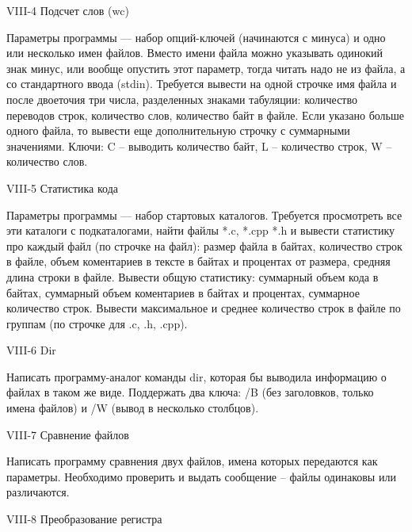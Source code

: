 
VIII-4 Подсчет слов (wc)

Параметры программы — набор опций-ключей (начинаются с минуса) и одно или
несколько имен файлов. Вместо имени файла можно указывать одинокий знак минус,
или вообще опустить этот параметр, тогда читать надо не из файла, а со
стандартного ввода (stdin). Требуется вывести на одной строчке имя файла и
после двоеточия три числа, разделенных знаками табуляции: количество переводов
строк, количество слов, количество байт в файле. Если указано больше одного
файла, то вывести еще дополнительную строчку с суммарными значениями. Ключи: C
– выводить количество байт, L – количество строк, W – количество слов.



VIII-5 Статистика кода

Параметры программы — набор стартовых каталогов. Требуется просмотреть все эти
каталоги с подкаталогами, найти файлы *.c, *.cpp *.h и вывести статистику про
каждый файл (по строчке на файл): размер файла в байтах, количество строк в
файле, объем коментариев в тексте в байтах и процентах от размера, средняя
длина строки в файле. Вывести общую статистику: суммарный объем кода в байтах,
суммарный объем коментариев в байтах и процентах, суммарное количество строк.
Вывести максимальное и среднее количество строк в файле по группам (по строчке
для .c, .h, .cpp).



VIII-6 Dir

Написать программу-аналог команды dir, которая бы выводила информацию о файлах
в таком же виде. Поддержать два ключа: /B (без заголовков, только имена
файлов) и /W (вывод в несколько столбцов).



VIII-7 Сравнение файлов

Написать программу сравнения двух файлов, имена которых передаются как
параметры. Необходимо проверить и выдать сообщение – файлы одинаковы или
различаются.



VIII-8 Преобразование регистра

